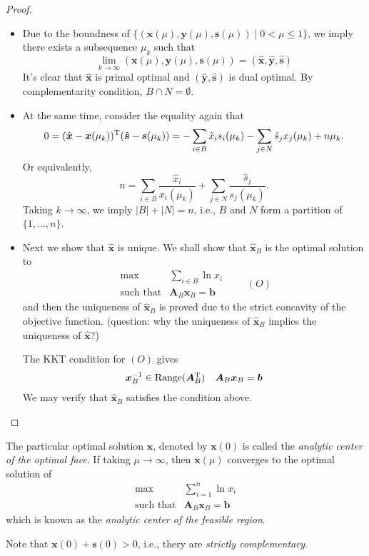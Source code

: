 \begin{proof}
\begin{itemize}
\item
Due to the boundness of $\{(\bm x(\mu),\bm y(\mu),\bm s(\mu))\mid 0<\mu\le 1\}$, we imply there exists a subsequence $\mu_k$ such that
\[
\lim_{k\to\infty}(\bm x(\mu),\bm y(\mu),\bm s(\mu)) = (\hat{\bm x},\hat{\bm y},\hat{\bm s})
\]
It's clear that $\hat{\bm x}$ is primal optimal and $(\hat{\bm y},\hat{\bm s})$ is dual optimal. By complementarity condition, $B\cap N=\emptyset$.
\item
At the same time, consider the equality again that
\[
0 = (\hat{\bm x} - \bm x(\mu_k))^{\mathrm T}(\hat{\bm s} - \bm s(\mu_k)) = -\sum_{i\in B}\hat x_is_i(\mu_k)
-
\sum_{j\in N}\hat s_jx_j(\mu_k) + n\mu_k.
\]
Or equivalently,
\[
n = \sum_{i\in B}\frac{\hat x_i}{x_i(\mu_k)}+\sum_{j\in N}\frac{\hat s_j}{s_j(\mu_k)}.
\]
Taking $k\to\infty$, we imply $|B|+|N| = n$, i.e., $B$ and $N$ form a partition of $\{1,\dots,n\}$.
\item
Next we show that $\hat{\bm x}$ is unique. We shall show that $\hat{\bm x}_B$ is the optimal solution to 
\[
\begin{array}{ll}
\max&\sum_{i\in B}\ln x_i\\
\mbox{such that}&\bm A_B\bm x_B=\bm b
\end{array}\qquad
(O)
\]
and then the uniqueness of $\hat{\bm x}_B$ is proved due to the strict concavity of the objective function. (question: why the uniqueness of $\hat{\bm x}_B$ implies the uniqueness of $\hat{\bm x}$?)

The KKT condition for $(O)$ gives
\[
\begin{array}{ll}
\bm x_B^{-1}\in\text{Range}(\bm A_B^{\mathrm T})
&
\bm A_B\bm x_B=\bm b
\end{array}
\]
We may verify that $\hat{\bm x}_B$ satisfies the condition above.
\end{itemize}
\end{proof}
\begin{remark}
The particular optimal solution $\bm x$, denoted by $\bm x(0)$ is called the \emph{analytic center of the optimal face}. If taking $\mu\to\infty$, then $\bm x(\mu)$ converges to the optimal solution of
\[
\begin{array}{ll}
\max&\sum_{i=1}^n\ln x_i\\
\mbox{such that}&\bm A_B\bm x_B=\bm b
\end{array}
\]
which is known as the \emph{analytic center of the feasible region}.

Note that $\bm x(0)+\bm s(0)>0$, i.e., thery are \emph{strictly complementary}.
\end{remark}












